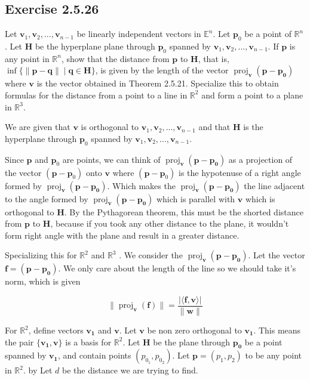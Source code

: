 \documentclass{tufte-book}
\DeclareMathOperator{\proj}{proj}
\newcommand{\vct}{\mathbf}
\newcommand{\dprod}[2]{\langle #1, #2 \rangle}
\theoremstyle{mytheoremstyle}
\theoremstyle{mylemstyle}
\theoremstyle{mydefstyle}
\begin{document}
\subsection{Exercise 2.5.26}
Let $\mathbf{v}_1,\mathbf{v}_2,...,\mathbf{v}_{n-1}$ be linearly independent vectors in $\mathbb{E}^n$. Let $\mathbf{p}_0$ be a point of $\mathbb{R}^n$.  Let $\mathbf{H}$ be the hyperplane plane through $\mathbf{p}_0$ spanned by $\mathbf{v}_1,\mathbf{v}_2,...,\mathbf{v}_{n-1}$. If $\mathbf{p}$ is any point in $\mathbb{R}^n$, show that the distance from $\mathbf{p}$ to $\mathbf{H}$, that is, $\inf\{\|\mathbf{p}-\mathbf{q}\| \mid \mathbf{q} \in \mathbf{H} \}$, is given by the length of the vector $\proj_\vct{v}(\vct{p} - \vct{p_0})$ where $\vct{v}$ is the vector obtained in Theorem 2.5.21. Specialize this to obtain formulas for the distance from a point to a line in $\mathbb{R}^2$ and form a point to a plane in $\mathbb{R}^3$.


We are given that $\vct{v}$ is orthogonal to $\vct{v}_1,\vct{v}_2,...,\vct{v}_{n-1}$ and that $\mathbf{H}$ is the hyperplane through $\vct{p}_0$ spanned by $\vct{v}_1,\vct{v}_2,...,\vct{v}_{n-1}$.

Since $\vct{p}$ and $\vct{p}_0$ are points, we can think of $\proj_\vct{v}(\vct{p} - \vct{p_0})$ as a projection of the vector $(\vct{p} - \vct{p}_0)$ onto $\vct{v}$ where $(\vct{p} - \vct{p}_0)$ is the hypotenuse of a right angle formed by $\proj_\vct{v}(\vct{p} - \vct{p_0})$. Which makes the $\proj_\vct{v}(\vct{p} - \vct{p_0})$ the line adjacent to the angle formed by $\proj_\vct{v}(\vct{p} - \vct{p_0})$  which is parallel with $\vct{v}$ which is orthogonal to $\mathbf{H}$.  By the Pythagorean theorem, this must be the shorted distance from $\vct{p}$ to $\mathbf{H}$, because if you took any other distance to the plane, it wouldn't form right angle with the plane and result in a greater distance.



Specializing this for $\mathbb{R}^2$ and $\mathbb{R}^3$ . We consider the $\proj_\vct{v}(\vct{p} - \vct{p_0})$.  Let the vector $\vct{f} = (\vct{p} - \vct{p_0})$.  We only care about the length of the line so we should take it's norm, which is given

\[ \|\proj_\vct{v}(\vct{f})\| = \frac{|\dprod{\vct{f}}{\vct{v}}|}{\|\vct{w}\|} \]

For $\mathbb{R}^2$, define vectors $\vct{v_1}$ and $\vct{v}$.  Let $\vct{v}$  be non zero orthogonal to $\vct{v_1}$.  This means the pair $\{\vct{v_1}, \vct{v}\}$ is a basis for $\mathbb{R}^2$.  Let $\mathbf{H}$ be the plane through $\vct{p_0}$ be a point spanned by $\vct{v_1}$, and contain points $(p_{0_1}, p_{0_2})$.  Let $\vct{p} = (p_1, p_2)$ to be any point in $\mathbb{R}^2$.  by Let $d$ be the distance we are trying to find.
\end{document}
